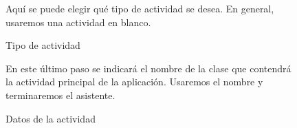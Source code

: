 \documentclass[a4paper,12pt,spanish]{sphinxmanual}
\begin{document}
\begin{figure}[htbp]
\centering
\capstart

\caption{Tipo de actividad}{\small 
Aquí se puede elegir qué tipo de actividad se desea. En general, usaremos una actividad en blanco.
}\end{figure}
\begin{figure}[htbp]
\centering
\capstart

\caption{Datos de la actividad}{\small 
En este último paso se indicará el nombre de la clase que contendrá la actividad principal de la aplicación. Usaremos el nombre  y terminaremos el asistente.
}\end{figure}
\end{document}
